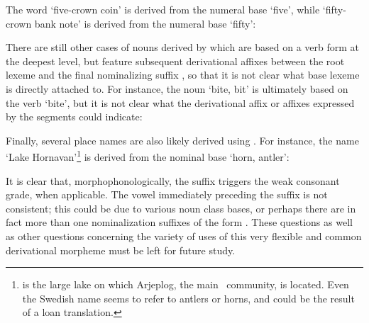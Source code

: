 The word  ‘five-crown coin’ is derived from the numeral base  ‘five’, while  ‘fifty-crown bank note’ is derived from the numeral base  ‘fifty’: %
\ea\label{NMLZ2ex6}
\z
\ea\label{NMLZ2ex7}
\z

There are still other cases of nouns derived by  which are based on a verb form at the deepest level, but feature subsequent derivational affixes between the root lexeme and the final nominalizing suffix , so that it is not clear what base lexeme  is directly attached to. For instance, the noun  ‘bite, bit’ is ultimately based on the verb  ‘bite’, but it is not clear what the derivational affix or affixes expressed by the segments  could indicate: %
\ea\label{NMLZ2ex8}
\z

Finally, several place names are also likely derived using . For instance, the name  ‘Lake Hornavan’\footnote{ is the large lake on which Arjeplog, the main \PS\ community, is located. Even the Swedish name  seems to refer to antlers or horns, and could be the result of a loan translation.} 
is derived from the nominal base  ‘horn, antler’: %
\ea\label{NMLZ2ex9}
\z

It is clear that, morphophonologically, the suffix  triggers the weak consonant grade, when applicable. The vowel immediately preceding the suffix  is not consistent; this could be due to various noun class bases, or perhaps there are in fact more than one nominalization suffixes of the form . These questions as well as other questions concerning the variety of uses of this very flexible and common derivational morpheme must be left for future study. 



